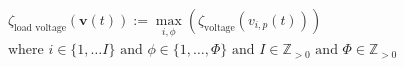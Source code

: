 \begin{equation}
\begin{split}
	&\zeta_\text{load voltage}(\textbf{v}(t)) := \max_{i,\phi}\left(\zeta_\text{voltage}(v_{i,p}(t))\right) \\
	&\text{where } i \in \{1, \dots I\} \text{ and } \phi \in \{1, \dots, \Phi\} \text{ and } I \in \mathbb{Z}_{>0} \text{ and } \Phi \in \mathbb{Z}_{>0}
\end{split}
\label{ch1:equ:load-voltage-deviation}
\end{equation}